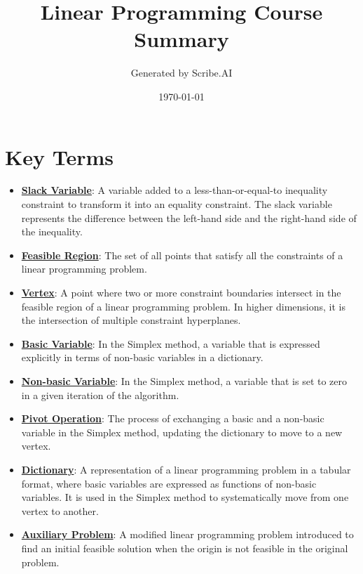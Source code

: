 \documentclass{article}%
\title{Linear Programming Course Summary}%
\author{Generated by Scribe.AI}%
\date{\today}%
\begin{document}
%
\normalsize%
\maketitle%
\section{Key Terms}%
\label{sec:KeyTerms}%
\begin{itemize}[leftmargin=*]%
\item \href{https://www.math.purdue.edu/~yipn/421/2024-08-27-ExSimplex.pdf#page=1}{\textbf{Slack Variable}}: A variable added to a less-than-or-equal-to inequality constraint to transform it into an equality constraint. The slack variable represents the difference between the left-hand side and the right-hand side of the inequality.%
\item \href{https://www.math.purdue.edu/~yipn/421/2024-08-27-ExSimplex.pdf#page=4}{\textbf{Feasible Region}}: The set of all points that satisfy all the constraints of a linear programming problem.%
\item \href{https://www.math.purdue.edu/~yipn/421/2024-08-27-ExSimplex.pdf#page=5}{\textbf{Vertex}}: A point where two or more constraint boundaries intersect in the feasible region of a linear programming problem. In higher dimensions, it is the intersection of multiple constraint hyperplanes.%
\item \href{https://www.math.purdue.edu/~yipn/421/2024-08-27-ExSimplex.pdf#page=6}{\textbf{Basic Variable}}: In the Simplex method, a variable that is expressed explicitly in terms of non-basic variables in a dictionary.%
\item \href{https://www.math.purdue.edu/~yipn/421/2024-08-27-ExSimplex.pdf#page=6}{\textbf{Non{-}basic Variable}}: In the Simplex method, a variable that is set to zero in a given iteration of the algorithm.%
\item \href{https://www.math.purdue.edu/~yipn/421/2024-08-27-ExSimplex.pdf#page=9}{\textbf{Pivot Operation}}: The process of exchanging a basic and a non-basic variable in the Simplex method, updating the dictionary to move to a new vertex.%
\item \href{https://www.math.purdue.edu/~yipn/421/2024-08-27-ExSimplex.pdf#page=26}{\textbf{Dictionary}}: A representation of a linear programming problem in a tabular format, where basic variables are expressed as functions of non-basic variables. It is used in the Simplex method to systematically move from one vertex to another.%
\item \href{https://www.math.purdue.edu/~yipn/421/2024-08-27-ExSimplex.pdf#page=32}{\textbf{Auxiliary Problem}}: A modified linear programming problem introduced to find an initial feasible solution when the origin is not feasible in the original problem.%
\end{itemize}%
\end{document}
